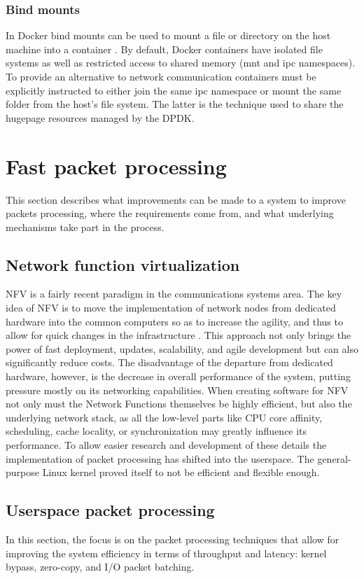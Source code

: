 \documentclass[english]{kththesis}
\begin{document}
\subsubsection{Bind mounts}
In Docker bind mounts can be used to mount a file or directory on the host machine into a container \cite{bind_mounts}. By default, Docker containers have isolated file systems as well as restricted access to shared memory (mnt and ipc namespaces). To provide an alternative to network communication containers must be explicitly instructed to either join the same ipc namespace or mount the same folder from the host's file system. The latter is the technique used to share the hugepage resources managed by the \gls{DPDK}.

\section{Fast packet processing}
This section describes what improvements can be made to a system to improve packets processing, where the requirements come from, and what underlying mechanisms take part in the process.

\subsection{Network function virtualization}
\gls{NFV} is a fairly recent paradigm in the communications systems area. The key idea of NFV is to move the implementation of network nodes from dedicated hardware into the common computers so as to increase the agility, and thus to allow for quick changes in the infrastructure \cite{nvf_redhat}. This approach not only brings the power of fast deployment, updates, scalability, and agile development but can also significantly reduce costs. The disadvantage of the departure from dedicated hardware, however, is the decrease in overall performance of the system, putting pressure mostly on its networking capabilities. When creating software for \gls{NFV} not only must the Network Functions themselves be highly efficient, but also the underlying network stack, as all the low-level parts like CPU core affinity, scheduling, cache locality, or synchronization may greatly influence its performance. To allow easier research and development of these details the implementation of packet processing has shifted into the userspace. The general-purpose Linux kernel proved itself to not be efficient and flexible enough.

\subsection{Userspace packet processing}
\label{userspace_pp}
In this section, the focus is on the packet processing techniques that allow for improving the system efficiency in terms of throughput and latency: kernel bypass, zero-copy, and I/O packet batching.
\end{document}
